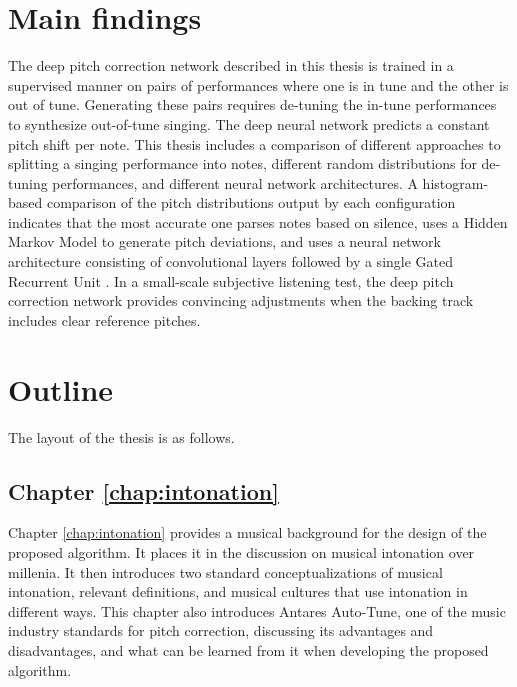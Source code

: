 \section{Main findings}
The deep pitch correction network described in this thesis is trained in a supervised manner on pairs of performances where one is in tune and the other is out of tune. Generating these pairs requires de-tuning the in-tune performances to synthesize out-of-tune singing. The deep neural network predicts a constant pitch shift per note. This thesis includes a comparison of different approaches to splitting a singing performance into notes, different random distributions for de-tuning performances, and different neural network architectures. A histogram-based comparison of the pitch distributions output by each configuration indicates that the most accurate one parses notes based on silence, uses a Hidden Markov Model \cite{rabiner1989tutorial} to generate pitch deviations, and uses a neural network architecture consisting of convolutional layers followed by a single Gated Recurrent Unit \cite{chung2014empirical}. In a small-scale subjective listening test, the deep pitch correction network provides convincing adjustments when the backing track includes clear reference pitches.

\section{Outline}
The layout of the thesis is as follows.

\subsection{Chapter \ref{chap:intonation}}
Chapter \ref{chap:intonation} provides a musical background for the design of the proposed algorithm. It places it in the discussion on musical intonation over millenia. It then introduces two standard conceptualizations of musical intonation, relevant definitions, and musical cultures that use intonation in different ways. This chapter also introduces Antares Auto-Tune, one of the music industry standards for pitch correction, discussing its advantages and disadvantages, and what can be learned from it when developing the proposed algorithm.

